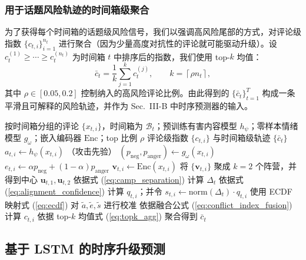 \documentclass[conference]{IEEEtran}
\begin{document}
\subsubsection{用于话题风险轨迹的时间箱级聚合}

为了获得每个时间箱的话题级风险信号，我们以强调高风险尾部的方式，对评论级指数 $\{c_{t,i}\}_{i=1}^{n_t}$ 进行聚合（因为少量高度对抗性的评论就可能驱动升级）。设 $c^{(1)}_t \ge \cdots \ge c^{(n_t)}_t$ 为时间箱 $t$ 中排序后的指数，我们使用 top-$k$ 均值：
\begin{equation}
\bar{c}_t = \frac{1}{k}\sum_{j=1}^{k} c^{(j)}_t,\qquad k=\left\lceil \rho n_t \right\rceil,
\label{eq:topk_agg}
\end{equation}
其中 $\rho\in[0.05,0.2]$ 控制纳入的高风险评论比例。由此得到的 $\{\bar{c}_t\}_{t=1}^T$ 构成一条平滑且可解释的风险轨迹，并作为 Sec.~III-B 中时序预测器的输入。

\begin{algorithm}[t]
\caption{无监督冲突指数计算}
\label{alg:conflict_index}
\begin{algorithmic}[1]
\REQUIRE 按时间箱分组的评论 $\{x_{t,i}\}$，时间箱为 $\mathcal{B}_t$；预训练有害内容模型 $h_\psi$；零样本情绪模型 $g_\omega$；嵌入编码器 $\mathrm{Enc}$；top 比例 $\rho$
\ENSURE 评论级指数 $\{c_{t,i}\}$ 与时间箱级轨迹 $\{\bar c_t\}$
    \STATE $a_{t,i}\leftarrow h_\psi(x_{t,i})$ \hfill （攻击先验）
    \STATE $(p_{\text{neg}},p_{\text{anger}})\leftarrow g_\omega(x_{t,i})$
    \STATE $e_{t,i}\leftarrow \alpha p_{\text{neg}}+(1-\alpha)p_{\text{anger}}$
    \STATE $\mathbf{v}_{t,i}\leftarrow \mathrm{Enc}(x_{t,i})$
  \ENDFOR
  \STATE 将 $\{\mathbf{v}_{t,i}\}$ 聚成 $k{=}2$ 个阵营，并得到中心 $\mathbf{u}_{t,1},\mathbf{u}_{t,2}$
  \STATE 依据式 (\ref{eq:camp_separation}) 计算 $\Delta_t$
    \STATE 依据式 (\ref{eq:alignment_confidence}) 计算 $q_{t,i}$；并令 $s_{t,i}\leftarrow \mathrm{norm}(\Delta_t)\cdot q_{t,i}$
  \ENDFOR
\ENDFOR
\STATE 使用 ECDF 映射式 (\ref{eq:ecdf}) 对 $\tilde{a},\tilde{e},\tilde{s}$ 进行校准
  \STATE 依据融合公式 (\ref{eq:conflict_index_fusion}) 计算 $c_{t,i}$
\ENDFOR
{}
  \STATE 依据 top-$k$ 均值式 (\ref{eq:topk_agg}) 聚合得到 $\bar c_t$
\ENDFOR
\end{algorithmic}
\end{algorithm}

\subsection{基于 LSTM 的时序升级预测}\label{sec:lstm_forecast}
\end{document}
